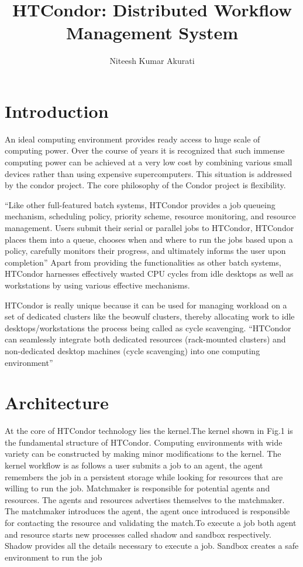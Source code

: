 \documentclass[9pt,twocolumn,twoside]{styles/osajnl}
\title{HTCondor: Distributed Workflow Management System}
\author[1,*]{Niteesh Kumar Akurati}
\affil[1]{School of Informatics and Computing, Bloomington, IN 47408, U.S.A.}
\affil[*]{Corresponding authors: akuratin@indiana.edu}
\begin{document}
\maketitle


\section{Introduction}
An ideal computing environment provides ready access to huge scale of
computing power. Over the course of years it is recognized that such
immense computing power can be achieved at a very low cost by
combining various small devices rather than using expensive
supercomputers. This situation is addressed by the condor project.
The core philosophy of the Condor project is flexibility.

``Like other full-featured batch systems, HTCondor provides a job
queueing mechanism, scheduling policy, priority scheme, resource
monitoring, and resource management. Users submit their serial or
parallel jobs to HTCondor, HTCondor places them into a queue, chooses
when and where to run the jobs based upon a policy, carefully monitors
their progress, and ultimately informs the user upon
completion''\cite{beowulfbook-condor} Apart from providing the
functionalities as other batch systems, HTCondor harnesses effectively
wasted CPU cycles from idle desktops as well as workstations by using
various effective mechanisms.

HTCondor is really unique because it can be used for managing workload
on a set of dedicated clusters like the beowulf clusters, thereby
allocating work to idle desktops/workstations the process being called
as cycle scavenging. ``HTCondor can seamlessly integrate both
dedicated resources (rack-mounted clusters) and non-dedicated desktop
machines (cycle scavenging) into one computing
environment''\cite{HTCondor_wikipedia}

\section{Architecture}

At the core of HTCondor technology lies the kernel.The kernel shown in
Fig.1 is the fundamental structure of HTCondor. Computing environments
with wide variety can be constructed by making minor modifications to
the kernel. The kernel workflow is as follows a user submits a job to
an agent, the agent remembers the job in a persistent storage while
looking for resources that are willing to run the job. Matchmaker is
responsible for potential agents and resources. The agents and
resources advertises themselves to the matchmaker. The matchmaker
introduces the agent, the agent once introduced is responsible for
contacting the resource and validating the match.To execute a job both
agent and resource starts new processes called shadow and sandbox
respectively. Shadow provides all the details necessary to execute a
job. Sandbox creates a safe environment to run the job
\cite{condor-practice}
\end{document}
